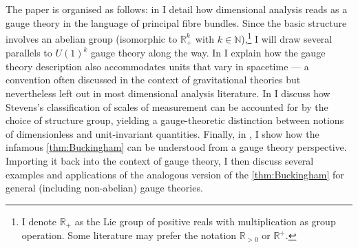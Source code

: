 \documentclass[12pt]{article}
\numberwithin{equation}{section}
\newcommand{\R}{\mathbb{R}}
\begin{document}
The paper is organised as follows: in  I detail how dimensional analysis reads as a gauge theory in the language of principal fibre bundles. Since the basic structure involves an abelian group (isomorphic to $\R_+^k$ with $k\in \mathbb{N}$),\footnote{I denote $\R_+$ as the Lie group of positive reals with multiplication as group operation. Some literature may prefer the notation $\R_{>0}$ or $\R^+$.} I will draw several parallels to $U(1)^k$ gauge theory along the way. In  I explain how the gauge theory description also accommodates units that vary in spacetime --- a convention often discussed in the context of gravitational theories but nevertheless left out in most dimensional analysis literature. In  I discuss how Stevens's classification of scales of measurement can be accounted for by the choice of structure group, yielding a gauge-theoretic distinction between notions of dimensionless and unit-invariant quantities. Finally, in , I show how the infamous \cref{thm:Buckingham} can be understood from a gauge theory perspective. Importing it back into the context of gauge theory, I then discuss several examples and applications of the analogous version of the \cref{thm:Buckingham} for general (including non-abelian) gauge theories.
\end{document}
